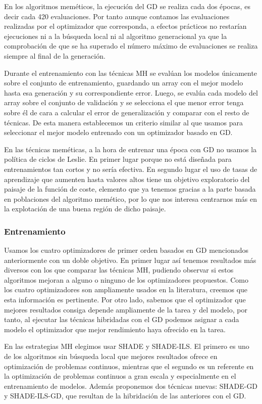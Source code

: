 En los algoritmos meméticos, la ejecución del GD se realiza cada dos épocas, es decir cada 420 evaluaciones. Por tanto aunque contamos las evaluaciones realizadas por el optimizador que corresponda, a efectos prácticos no restarían ejecuciones ni a la búsqueda local ni al algoritmo generacional ya que la comprobación de que se ha superado el número máximo de evaluaciones se realiza siempre al final de la generación.

Durante el entrenamiento con las técnicas MH se evalúan los modelos únicamente sobre el conjunto de entrenamiento, guardando un array con el mejor modelo hasta esa generación y su correspondiente error. Luego, se evalúa cada modelo del array sobre el conjunto de validación y se selecciona el que menor error tenga sobre él de cara a calcular el error de generalización y comparar con el resto de técnicas. De esta manera establecemos un criterio similar al que usamos para seleccionar el mejor modelo entrenado con un optimizador basado en GD.

En las técnicas meméticas, a la hora de entrenar una época con GD no usamos la política de ciclos de Leslie. En primer lugar porque no está diseñada para entrenamientos tan cortos y no sería efectiva. En segundo lugar el uso de tasas de aprendizaje que aumenten hasta valores altos tiene un objetivo exploratorio del paisaje de la función de coste, elemento que ya tenemos gracias a la parte basada en poblaciones del algoritmo memético, por lo que nos interesa centrarnos más en la explotación de una buena región de dicho paisaje.


\subsubsection{Entrenamiento}

Usamos los cuatro optimizadores de primer orden basados en GD mencionados anteriormente con un doble objetivo. En primer lugar así tenemos resultados más diversos con los que comparar las técnicas MH, pudiendo observar si estos algoritmos mejoran a alguno o ninguno de los optimizadores propuestos. Como los cuatro optimizadores son ampliamente usados en la literatura, creemos que esta información es pertinente. Por otro lado, sabemos que el optimizador que mejores resultados consiga depende ampliamente de la tarea y del modelo, por tanto, al ejecutar las técnicas hibridadas con el GD podemos asignar a cada modelo el optimizador que mejor rendimiento haya ofrecido en la tarea.

En las estrategias MH elegimos usar SHADE y SHADE-ILS. El primero es uno de los algoritmos sin búsqueda local que mejores resultados ofrece en optimización de problemas continuos, mientras que el segundo es un referente en la optimización de problemas continuos a gran escala y especialmente en el entrenamiento de modelos. Además proponemos dos técnicas nuevas: SHADE-GD y SHADE-ILS-GD, que resultan de la hibridación de las anteriores con el GD. 

